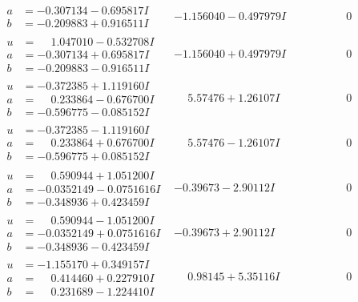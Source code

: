 \documentclass[1p]{elsarticle_modified}
\theoremstyle{definition}
\begin{document}
$$\begin{array}{c|c|c}
\begin{aligned}
a &= -0.307134 - 0.695817 I \\
b &= -0.209883 + 0.916511 I\end{aligned}
 & -1.156040 - 0.497979 I & \phantom{-0.000000 } 0 \\ \hline\begin{aligned}
u &= \phantom{-}1.047010 - 0.532708 I \\
a &= -0.307134 + 0.695817 I \\
b &= -0.209883 - 0.916511 I\end{aligned}
 & -1.156040 + 0.497979 I & \phantom{-0.000000 } 0 \\ \hline\begin{aligned}
u &= -0.372385 + 1.119160 I \\
a &= \phantom{-}0.233864 - 0.676700 I \\
b &= -0.596775 - 0.085152 I\end{aligned}
 & \phantom{-}5.57476 + 1.26107 I & \phantom{-0.000000 } 0 \\ \hline\begin{aligned}
u &= -0.372385 - 1.119160 I \\
a &= \phantom{-}0.233864 + 0.676700 I \\
b &= -0.596775 + 0.085152 I\end{aligned}
 & \phantom{-}5.57476 - 1.26107 I & \phantom{-0.000000 } 0 \\ \hline\begin{aligned}
u &= \phantom{-}0.590944 + 1.051200 I \\
a &= -0.0352149 - 0.0751616 I \\
b &= -0.348936 + 0.423459 I\end{aligned}
 & -0.39673 - 2.90112 I & \phantom{-0.000000 } 0 \\ \hline\begin{aligned}
u &= \phantom{-}0.590944 - 1.051200 I \\
a &= -0.0352149 + 0.0751616 I \\
b &= -0.348936 - 0.423459 I\end{aligned}
 & -0.39673 + 2.90112 I & \phantom{-0.000000 } 0 \\ \hline\begin{aligned}
u &= -1.155170 + 0.349157 I \\
a &= \phantom{-}0.414460 + 0.227910 I \\
b &= \phantom{-}0.231689 - 1.224410 I\end{aligned}
 & \phantom{-}0.98145 + 5.35116 I & \phantom{-0.000000 } 0 \\ \hline\begin{aligned}

\end{aligned}
\end{array}$$
\end{document}
